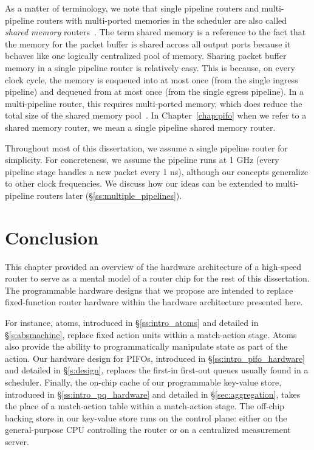 As a matter of terminology, we note that single pipeline routers and
multi-pipeline routers with multi-ported memories in the scheduler are also
called {\em shared memory} routers~\cite{dctcp}. The term shared memory is a
reference to the fact that the memory for the packet buffer is shared across
all output ports because it behaves like one logically centralized pool of
memory. Sharing packet buffer memory in a single pipeline router is relatively
easy. This is because, on every clock cycle, the memory is enqueued into at
most once (from the single ingress pipeline) and dequeued from at most once
(from the single egress pipeline). In a multi-pipeline router, this requires
multi-ported memory, which does reduce the total size of the shared memory
pool~\cite{dctcp}. In Chapter~\ref{chap:pifo} when we refer to a shared memory
router, we mean a single pipeline shared memory router. 

Throughout most of this dissertation, we assume a single pipeline router for
simplicity. For concreteness, we assume the pipeline runs at 1 GHz (\ie every
pipeline stage handles a new packet every 1 ns), although our concepts
generalize to other clock frequencies. We discuss how our ideas can be extended
to multi-pipeline routers later (\S\ref{ss:multiple_pipelines}). 

\section{Conclusion}
This chapter provided an overview of the hardware architecture of a high-speed
router to serve as a mental model of a router chip for the rest of this
dissertation.  The programmable hardware designs that we propose are intended
to replace fixed-function router hardware within the hardware architecture
presented here.

For instance, atoms, introduced in \S\ref{ss:intro_atoms} and detailed in
\S\ref{s:absmachine}, replace fixed action units within a match-action stage.
Atoms also provide the ability to programmatically manipulate state as part of
the action.  Our hardware design for PIFOs, introduced in
\S\ref{ss:intro_pifo_hardware} and detailed in \S\ref{s:design}, replaces the
first-in first-out queues usually found in a scheduler. Finally, the on-chip
cache of our programmable key-value store, introduced in
\S\ref{ss:intro_pq_hardware} and detailed in \S\ref{sec:aggregation}, takes the
place of a match-action table within a match-action stage. The off-chip backing
store in our key-value store runs on the control plane: either on the
general-purpose CPU controlling the router or on a centralized measurement
server.
